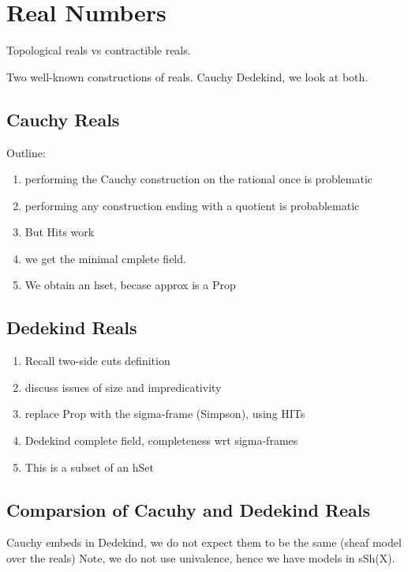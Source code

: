 \chapter{Real Numbers}
\label{cha:real-numbers}

Topological reals vs contractible reals.

Two well-known constructions of reals. Cauchy Dedekind, we look at both.

\section{Cauchy Reals}
\label{sec:cauchy-reals}

Outline:
\begin{enumerate}
  \item performing the Cauchy construction on the rational once is problematic
  \item performing any construction ending with a quotient is probablematic
  \item But Hits work
  \item we get the minimal cmplete field.
  \item We obtain an hset, becase approx is a Prop
\end{enumerate}

\section{Dedekind Reals}
\label{sec:dedekind-reals}

\begin{enumerate}
\item Recall two-side cuts definition
\item discuss issues of size and impredicativity
\item replace Prop with the sigma-frame (Simpson), using HITs
\item Dedekind complete field, completeness wrt sigma-frames
\item This is a subset of an hSet
\end{enumerate}

\section{Comparsion of Cacuhy and Dedekind Reals}
\label{sec:comp-cacuhy-dedek}

Cauchy embeds in Dedekind, we do not expect them to be the same (sheaf model over the
reals) Note, we do not use univalence, hence we have models in sSh(X).

